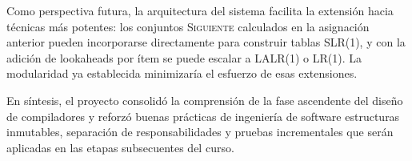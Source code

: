 \indent Como perspectiva futura, la arquitectura del sistema facilita la extensión hacia
técnicas más potentes: los conjuntos \textsc{Siguiente} \textemdash{}calculados en la
asignación anterior\textemdash{} pueden incorporarse directamente para construir tablas
SLR(1), y con la adición de lookaheads por ítem se puede escalar a LALR(1) o LR(1). La
modularidad ya establecida minimizaría el esfuerzo de esas extensiones.

\indent En síntesis, el proyecto consolidó la comprensión de la fase ascendente del diseño
de compiladores y reforzó buenas prácticas de ingeniería de software \textemdash{}estructuras
inmutables, separación de responsabilidades y pruebas incrementales\textemdash{} que serán
aplicadas en las etapas subsecuentes del curso.
